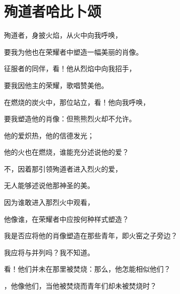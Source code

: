 
\chapter{殉道者哈比卜颂}


\par

殉道者，身披火焰，从火中向我呼唤，\par

要我为他也在荣耀者中塑造一幅美丽的肖像。\par

征服者的同伴，看！他从烈焰中向我招手，\par

要我因他主的荣耀，歌唱赞美他。\par

在燃烧的炭火中，那位站立，看！他向我呼唤，\par

要我塑造他的肖像：但熊熊烈火却不允许。\par

他的爱炽热，他的信德发光；\par

他的火也在燃烧，谁能充分述说他的爱？\par

不，因着那引领殉道者进入烈火的爱，\par

无人能够述说他那神圣的美。\par

因为谁敢进入那烈火中观看，\par

他像谁，在荣耀者中应按何种样式塑造？\par

我是否应将他的肖像塑造在那些青年，即火窑之子旁边？\par

我应将与并列吗？我不知道。\par

看！他们并未在那里被焚烧：那么，他怎能相似他们？\par

，他像他们，当他被焚烧而青年们却未被焚烧时？\par


